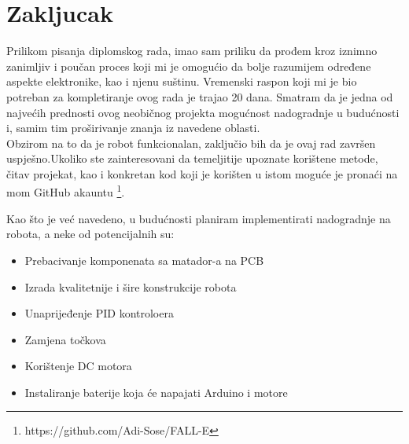 \documentclass[../Document.tex]{subfiles}
\begin{document}
\section{Zakljucak}
Prilikom pisanja diplomskog rada, imao sam priliku da prođem kroz iznimno zanimljiv i poučan proces koji mi je omogućio da bolje razumijem određene aspekte elektronike, kao i njenu suštinu. Vremenski raspon koji mi je bio potreban za kompletiranje ovog rada je trajao 20 dana. Smatram da je jedna od najvećih prednosti ovog neobičnog projekta mogućnost nadogradnje u budućnosti i, samim tim proširivanje znanja iz navedene oblasti.\\

\noindent Obzirom na to da je robot funkcionalan, zaključio bih da je ovaj rad završen uspješno.Ukoliko ste zainteresovani da temeljitije upoznate korištene metode, čitav projekat, kao i konkretan kod koji je korišten u istom moguće je pronaći na mom GitHub akauntu \footnote{https://github.com/Adi-Sose/FALL-E}.

\noindent Kao što je već navedeno, u budućnosti planiram implementirati nadogradnje na robota, a neke od potencijalnih su:

\begin{itemize}
    \item Prebacivanje komponenata sa matador-a na PCB
    \item Izrada kvalitetnije i šire konstrukcije robota
    \item Unaprijeđenje PID kontroloera
    \item Zamjena točkova
    \item Korištenje DC motora
    \item Instaliranje baterije koja će napajati Arduino i motore
\end{itemize}
\end{document}
